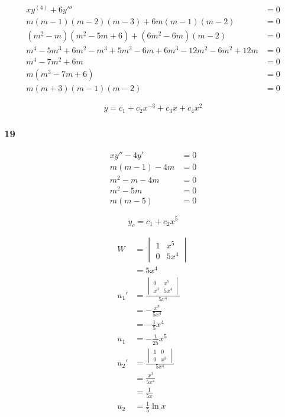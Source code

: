 \documentclass{article}
\begin{document}
\begin{align*}
  xy^{(4)} + 6y'''                                                & = 0 \\
  m (m - 1) (m - 2) (m - 3) + 6 m (m - 1) (m - 2)                 & = 0 \\
  (m^2 - m) (m^2 - 5m + 6) + (6m^2 - 6m) (m - 2)                  & = 0 \\
  m^4 - 5m^3 + 6m^2 - m^3 + 5m^2 - 6m + 6m^3 - 12m^2 - 6m^2 + 12m & = 0 \\
  m^4 - 7m^2 + 6m                                                 & = 0 \\
  m (m^3 - 7m + 6)                                                & = 0 \\
  m (m + 3) (m - 1) (m - 2)                                       & = 0
\end{align*}

\[y = c_1 + c_2 x^{-3} + c_3 x + c_4 x^2\]

\subsubsection{19}

\begin{align*}
  x y'' - 4y'    & = 0 \\
  m (m - 1) - 4m & = 0 \\
  m^2 - m - 4m   & = 0 \\
  m^2 - 5m       & = 0 \\
  m (m - 5)      & = 0
\end{align*}

\[y_c = c_1 + c_2 x^5\]

\begin{align*}
  W    & = \begin{vmatrix}
             1 & x^5  \\
             0 & 5x^4
           \end{vmatrix}             \\
       & = 5x^4                       \\
  u_1' & = \frac{\begin{vmatrix}
                     0   & x^5  \\
                     x^3 & 5x^4
                   \end{vmatrix}}{5x^4} \\
       & = -\frac{x^8}{5x^4}          \\
       & = -\frac{1}{5} x^4           \\
  u_1  & = -\frac{1}{25} x^5          \\
  u_2' & = \frac{\begin{vmatrix}
                     1 & 0   \\
                     0 & x^3
                   \end{vmatrix}}{5x^4} \\
       & = \frac{x^3}{5x^4}           \\
       & = \frac{1}{5x}               \\
  u_2  & = \frac{1}{5} \ln x
\end{align*}
\end{document}
